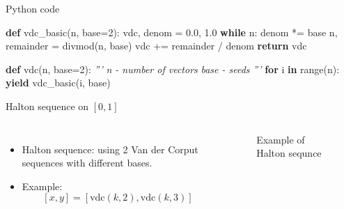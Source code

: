 \documentclass[10pt,ignorenonframetext,serif,onlymath]{beamer}
\newenvironment{Shaded}{}{}
\newcommand{\BuiltInTok}[1]{#1}
\newcommand{\CommentTok}[1]{\textcolor[rgb]{0.38,0.63,0.69}{\textit{#1}}}
\newcommand{\ControlFlowTok}[1]{\textcolor[rgb]{0.00,0.44,0.13}{\textbf{#1}}}
\newcommand{\DecValTok}[1]{\textcolor[rgb]{0.25,0.63,0.44}{#1}}
\newcommand{\FloatTok}[1]{\textcolor[rgb]{0.25,0.63,0.44}{#1}}
\newcommand{\KeywordTok}[1]{\textcolor[rgb]{0.00,0.44,0.13}{\textbf{#1}}}
\newcommand{\NormalTok}[1]{#1}
\newcommand{\OperatorTok}[1]{\textcolor[rgb]{0.40,0.40,0.40}{#1}}
\begin{document}
\begin{frame}[fragile]{Python code}
\protect\hypertarget{python-code}{}

\begin{Shaded}
\begin{Highlighting}[]
\KeywordTok{def}\NormalTok{ vdc_basic(n, base}\OperatorTok{=}\DecValTok{2}\NormalTok{):}
\NormalTok{    vdc, denom }\OperatorTok{=} \FloatTok{0.0}\NormalTok{, }\FloatTok{1.0}
    \ControlFlowTok{while}\NormalTok{ n:}
\NormalTok{        denom }\OperatorTok{*=}\NormalTok{ base}
\NormalTok{        n, remainder }\OperatorTok{=} \BuiltInTok{divmod}\NormalTok{(n, base)}
\NormalTok{        vdc }\OperatorTok{+=}\NormalTok{ remainder }\OperatorTok{/}\NormalTok{ denom}
    \ControlFlowTok{return}\NormalTok{ vdc}

\KeywordTok{def}\NormalTok{ vdc(n, base}\OperatorTok{=}\DecValTok{2}\NormalTok{):}
    \CommentTok{'''}
\CommentTok{    n - number of vectors}
\CommentTok{    base - seeds}
\CommentTok{    '''}
    \ControlFlowTok{for}\NormalTok{ i }\KeywordTok{in} \BuiltInTok{range}\NormalTok{(n):}
        \ControlFlowTok{yield}\NormalTok{ vdc_basic(i, base)}
\end{Highlighting}
\end{Shaded}

\end{frame}

\begin{frame}{Halton sequence on \([0,1]\)}
\protect\hypertarget{halton-sequence-on-01}{}

\begin{columns}


\begin{itemize}
\item
  Halton sequence: using 2 Van der Corput sequences with different
  bases.
\item
  Example: \[[x,y] = [\mathrm{vdc}(k,2), \mathrm{vdc}(k,3)]\]
\end{itemize}


\begin{figure}[hp]
\centering

\caption{Example of Halton sequnce}%
\label{fig:halton}
\end{figure}

\end{columns}

\end{frame}
\end{document}
